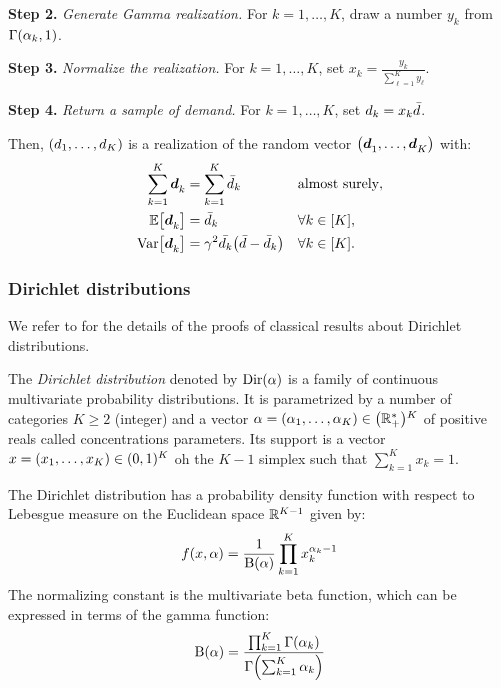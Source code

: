 \textbf{Step 2.} \emph{Generate Gamma realization.}
For $k=1,\ldots,K$, draw a number $y_k$ from $\Gamma\bracket{\alpha_k,1}$.

\textbf{Step 3.} \emph{Normalize the realization.}
For $k=1,\ldots,K$, set $x_k=\frac{y_k}{\sum_{\ell=1}^K y_{\ell}}$.

\textbf{Step 4.} \emph{Return a sample of demand.}
For $k=1,\ldots,K$, set $d_k = x_k \bar{d}$.

Then, $\bracket{\demand_1,\ldots,\demand_K}$ is a realization of the random vector $\bracket{\va\demand_1,\ldots,\va\demand_K}$ with:
\begin{subequations}
  \begin{align}
    \sum_{k=1}^K \va\demand_k &= \sum_{k=1}^K \bar{\demand}_k && \mbox{almost surely},
    \\
    \espe\sqbracket{\va\demand_k} &= \bar{\demand}_k && \forall k\in\range{K},
    \\
    \vari\sqbracket{\va\demand_k} &= \gamma^2\bar{\demand_k}\bracket{\bar{\demand}-\bar{\demand}_k} && \forall k\in\range{K}.
    \label{eq:dirichlet:procedure:variance}
  \end{align}
\end{subequations}



\subsubsection{Dirichlet distributions}

We refer to \cite[Chapter 49]{Kotz2000} for the details of the proofs of classical results about Dirichlet distributions.

The \emph{Dirichlet distribution} denoted by $\mathrm{Dir}(\alpha)$ is a family of continuous multivariate probability distributions.
It is parametrized by a number of categories $K \ge 2$ (integer) and a vector $\alpha=\bracket{\alpha_1,\ldots,\alpha_K}\in\bracket{\RR_+^*}^K$ of positive reals called concentrations parameters.
Its support is a vector $x=\bracket{x_1,\ldots,x_K}\in\bracket{0,1}^K$ oh the $K-1$ simplex \ie such that $\sum_{k=1}^K x_k = 1$.

The Dirichlet distribution has a probability density function with respect to Lebesgue measure on the Euclidean space $\mathbb{R}^{K-1}$ given by:
\begin{equation}\label{eq:dirchlet:probability-density-function}
  f\bracket{x,\alpha} = \frac{1}{ \Beta\bracket{\alpha}}\prod_{k=1}^K x_k^{\alpha_k-1}
\end{equation}
The normalizing constant is the multivariate beta function, which can be expressed in terms of the gamma function:
\begin{equation}
  \Beta\bracket{\alpha} =
  \frac{ \prod_{k=1}^K \Gamma\bracket{\alpha_k} }
       { \Gamma\bracket{\sum_{k=1}^K \alpha_k} }
\end{equation}


